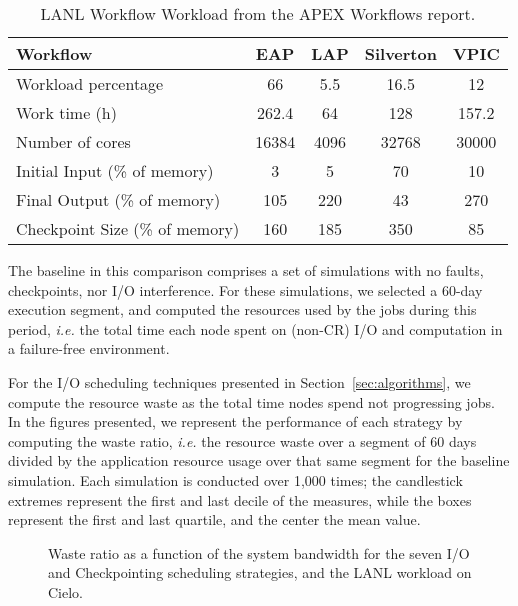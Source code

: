 \documentclass[two]{article}
\newcommand{\ie}[0]{\emph{i.e.}\xspace}
\begin{document}
\begin{table}
\begin{tabular}{|l|c|c|c|c|}
\hline
 Workflow & EAP & LAP & Silverton & VPIC \\\hline
Workload percentage & 66 & 5.5 & 16.5 & 12 \\\hline
Work time (h) & 262.4 & 64 & 128 & 157.2 \\\hline
Number of cores & 16384 & 4096 & 32768 & 30000 \\\hline
Initial Input (\% of memory) &  3 & 5 & 70 & 10 \\\hline
Final Output (\% of memory) & 105 & 220 & 43 & 270 \\\hline
Checkpoint Size (\% of memory) & 160 & 185 & 350 & 85 \\\hline
\end{tabular}
\caption{LANL Workflow Workload from the APEX Workflows report.\label{table:lanl}}
\end{table}

The baseline in this comparison comprises a set of simulations with no faults,
checkpoints, nor I/O interference. For these simulations, we selected a 60-day
execution segment, and computed the resources used by the jobs during this
period, \ie the total time each node spent on (non-CR) I/O and computation in a
failure-free environment.

For the I/O scheduling techniques presented in Section~\ref{sec:algorithms}, we
compute the resource waste as the total time nodes spend not progressing jobs.
In the figures presented, we represent the performance of each strategy by
computing the waste ratio, \ie the resource waste over a segment of 60 days
divided by the application resource usage over that same segment for the
baseline simulation. Each simulation is conducted over 1,000 times; the
candlestick extremes represent the first and last decile of the measures, while
the boxes represent the first and last quartile, and the center the mean value.

\begin{figure}
  \begin{center}
    \resizebox{1.05\linewidth}{!}{}
  \end{center}
  \caption{Waste ratio as a function of the system bandwidth for the
    seven I/O and Checkpointing scheduling strategies, and the LANL workload on
    Cielo. \label{fig:cielo-1hmtbf}}
\end{figure}
\end{document}
